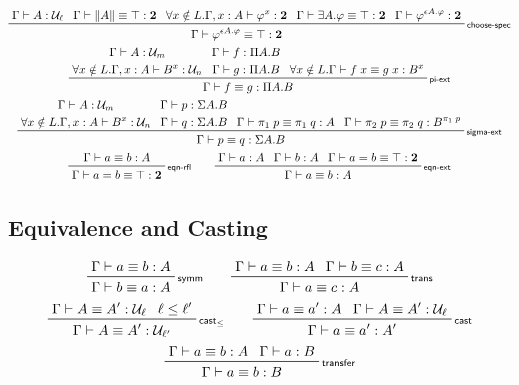 \documentclass[acmsmall,screen,review]{acmart}
\newcommand{\mc}[1]{\ensuremath{\mathcal{#1}}}
\newcommand{\mb}[1]{\ensuremath{\mathbf{#1}}}
\newcommand{\rle}[1]{{\scriptsize\textsf{#1}}}
\newcommand{\jeq}[4]{#1 \vdash #2 \equiv #3 : #4}
\newcommand{\hasty}[3]{#1 \vdash #2 : #3}
\newcommand{\opv}[2]{#1^{#2}}
\begin{document}
\begin{gather*}
    \prftree[r]{\rle{choose-spec}}
        {\hasty{\Gamma}{A}{\mc{U}_\ell}}
        {\jeq{\Gamma}{\|A\|}{\top}{\mb{2}}}
        {\forall x \notin L . 
            \hasty{\Gamma, x : A}{\opv{\varphi}{x}}{\mb{2}}}
        {\jeq{\Gamma}{\exists A . \varphi}{\top}{\mb{2}}}
        {\hasty{\Gamma}{\opv{\varphi}{\epsilon A . \varphi}}{\mb{2}}}
        {\jeq{\Gamma}{\opv{\varphi}{\epsilon A . \varphi}}{\top}{\mb{2}}}
    \\
    \prftree[r]{\rle{pi-ext}}
        {
        \prfStackPremises
        {\hasty{\Gamma}{A}{\mc{U}_m}}
        {\forall x \notin L .
            \hasty{\Gamma, x : A}{\opv{B}{x}}{\mc{U}_n}}
        }
        {
        \prfStackPremises
        {\hasty{\Gamma}{f}{\Pi A . B}}
        {\hasty{\Gamma}{g}{\Pi A . B}}
        }
        {\forall x \notin L .
            \jeq{\Gamma}{f\;x}{g\;x}{\opv{B}{x}}}
        {\jeq{\Gamma}{f}{g}{\Pi A . B}}
    \\
    \prftree[r]{\rle{sigma-ext}}
        {
        \prfStackPremises
        {\hasty{\Gamma}{A}{\mc{U}_m}}
        {\forall x \notin L .
            \hasty{\Gamma, x : A}{\opv{B}{x}}{\mc{U}_n}}
        }
        {
        \prfStackPremises
        {\hasty{\Gamma}{p}{\Sigma A . B}}
        {\hasty{\Gamma}{q}{\Sigma A . B}}
        }
        {\jeq{\Gamma}{\pi_1\;p}{\pi_1\;q}{A}}
        {\jeq{\Gamma}{\pi_2\;p}{\pi_2\;q}{\opv{B}{\pi_1\;p}}}
        {\jeq{\Gamma}{p}{q}{\Sigma A . B}}
    \\
    \prftree[r]{\rle{eqn-rfl}}
        {\jeq{\Gamma}{a}{b}{A}}
        {\jeq{\Gamma}{a = b}{\top}{\mb{2}}} \qquad
    \prftree[r]{\rle{eqn-ext}}
        {\hasty{\Gamma}{a}{A}}
        {\hasty{\Gamma}{b}{A}}
        {\jeq{\Gamma}{a = b}{\top}{\mb{2}}}
        {\jeq{\Gamma}{a}{b}{A}}
\end{gather*}

\subsection{Equivalence and Casting}

\begin{gather*}
    \prftree[r]{\rle{symm}}
        {\jeq{\Gamma}{a}{b}{A}}
        {\jeq{\Gamma}{b}{a}{A}} \qquad
    \prftree[r]{\rle{trans}}
        {\jeq{\Gamma}{a}{b}{A}}
        {\jeq{\Gamma}{b}{c}{A}}
        {\jeq{\Gamma}{a}{c}{A}} \\
    \prftree[r]{\rle{cast$_\leq$}}
        {\jeq{\Gamma}{A}{A'}{\mc{U}_\ell}}
        {\ell \leq \ell'}
        {\jeq{\Gamma}{A}{A'}{\mc{U}_{\ell'}}} \qquad
    \prftree[r]{\rle{cast}}
        {\jeq{\Gamma}{a}{a'}{A}}
        {\jeq{\Gamma}{A}{A'}{\mc{U}_\ell}}
        {\jeq{\Gamma}{a}{a'}{A'}} \\
    \prftree[r]{\rle{transfer}}
        {\jeq{\Gamma}{a}{b}{A}}
        {\hasty{\Gamma}{a}{B}}
        {\jeq{\Gamma}{a}{b}{B}}
\end{gather*}
\end{document}
